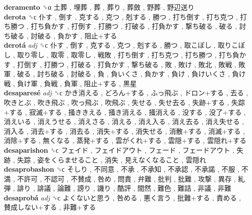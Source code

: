 \textbf{deramento} ␝α   土葬 ,  埋葬 ,  葬 ,  葬り ,  葬斂 ,  野葬 ,  野辺送り   \\
\textbf{derota} ␝ϲ   仆す ,  倒す ,  克する ,  克つ ,  剋する ,  勝つ ,  打ち倒す ,  打ち克つ ,  打ち勝つ ,  打ち負かす ,  打倒す ,  打勝つ ,  打破る ,  打負かす ,  撃ち破る ,  破る ,  討ち破る ,  討破る ,  負かす ,  阻止+する   \\
\textbf{derotá} \emph{adj}  ␝ϲ   仆す ,  倒す ,  克する ,  克つ ,  剋する ,  勝つ ,  取こぼし ,  取りこぼし ,  取り零し ,  取零 ,  取零し ,  戦敗 ,  打ち倒す ,  打ち克つ ,  打ち勝つ ,  打ち負かす ,  打倒す ,  打勝つ ,  打破る ,  打負かす ,  撃ち破る ,  敗 ,  敗け ,  敗北 ,  敗戦 ,  敗軍 ,  破る ,  討ち破る ,  討破る ,  負 ,  負いくさ ,  負かす ,  負け ,  負けいくさ ,  負け戦 ,  負け軍 ,  負戦 ,  負軍 ,  阻止+する ,  黒星   \\
\textbf{desaparesé} \emph{adj}  ␝ϲ   かき消える ,  どろん+する ,  ふっ飛ぶ ,  ドロン+する ,  去る ,  吹きとぶ ,  吹き飛ぶ ,  吹っ飛ぶ ,  吹飛ぶ ,  失せる ,  失せ去る ,  失跡+する ,  失踪+する ,  寂滅+する ,  掻ききえる ,  掻き消える ,  掻消える ,  没する ,  没了+する ,  消えいる ,  消えうせる ,  消えさる ,  消える ,  消え入る ,  消え去る ,  消え失せる ,  消入る ,  消去+する ,  消去る ,  消失+する ,  消失せる ,  消散+する ,  消滅+する ,  消除+する ,  無くなる ,  蒸発+する ,  雲がくれ+する ,  雲隠+する ,  雲隠れ+する   \\
\textbf{desaparishon} ␝ϲ   フェイド ,  フェイドアウト ,  フェード ,  フェードアウト ,  失跡 ,  失踪 ,  姿をくらませること ,  消失 ,  見えなくなること ,  雲隠れ   \\
\textbf{desaprobashon} ␝ϲ   そしり ,  不同意 ,  不承 ,  不承知 ,  不承認 ,  不承諾 ,  不服 ,  不満 ,  不許可 ,  不認可 ,  不賛成 ,  咎め ,  問責 ,  弁難 ,  批判 ,  批難 ,  攻撃 ,  異存 ,  糺弾 ,  誹り ,  誹議 ,  論難 ,  謗り ,  譏り ,  酷評 ,  間然 ,  難色 ,  難詰 ,  非議 ,  非難   \\
\textbf{desaprobá} \emph{adj}  ␝ϲ   よくないと思う ,  咎める ,  悪く言う ,  批難+する ,  責める ,  賛成しない+する ,  非難+する   \\
